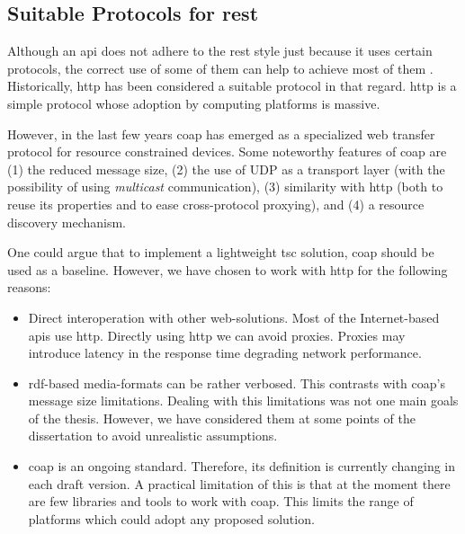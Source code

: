 \subsection{Suitable Protocols for \ac{rest}}
\label{sec:protocols}

Although an \ac{api} does not adhere to the \ac{rest} style just because it uses certain protocols,
the correct use of some of them can help to achieve most of them \citep{moore_hypermedia_2010}.
Historically, \acf{http} has been considered a suitable protocol in that regard.
\ac{http} is a simple protocol whose adoption by computing platforms is massive.


However, in the last few years \acf{coap} has emerged as a specialized web transfer protocol for resource constrained devices. %
Some noteworthy features of \ac{coap} are
(1) the reduced message size,
(2) the use of UDP as a transport layer (with the possibility of using \emph{multicast} communication),
(3) similarity with \ac{http} (both to reuse its properties and to ease cross-protocol proxying), and
(4) a resource discovery mechanism. %


One could argue that to implement a lightweight \ac{tsc} solution, \ac{coap} should be used as a baseline.
However, we have chosen to work with \ac{http} for the following reasons:
\begin{itemize}
  \item Direct interoperation with other web-solutions.
        Most of the Internet-based \ac{api}s use \ac{http}.
        Directly using \ac{http} we can avoid proxies.
        Proxies may introduce latency in the response time degrading network performance. %
  \item \ac{rdf}-based media-formats can be rather verbosed.
	This contrasts with \ac{coap}'s message size limitations.
	Dealing with this limitations was not one main goals of the thesis.
	However, we have considered them at some points of the dissertation to avoid unrealistic assumptions.
  \item \ac{coap} is an ongoing standard.
        Therefore, its definition is currently changing in each draft version.
        A practical limitation of this is that at the moment there are few libraries and tools to work with \ac{coap}.
        This limits the range of platforms which could adopt any proposed solution.
\end{itemize}



